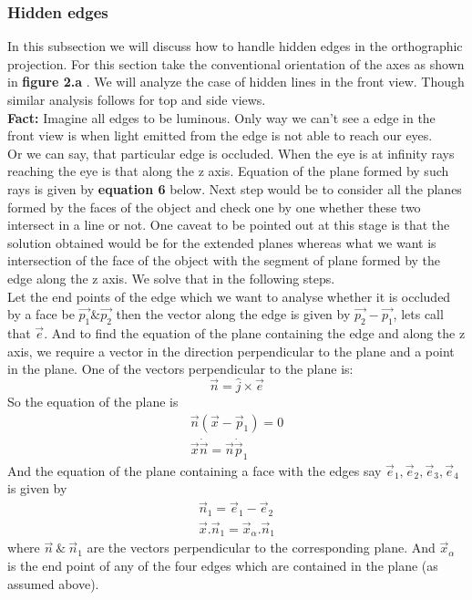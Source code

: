 \subsubsection{Hidden edges}
In this subsection we will discuss how to handle hidden edges in the orthographic projection. For this section take the conventional orientation of the axes as shown in \textbf{figure 2.a }. We will analyze the case of hidden lines in the front view.  Though similar analysis follows for top and side views.\\
\textbf{Fact:} Imagine all edges to be luminous. Only way we can't see a edge in the front view is when light emitted from the edge is not able to reach our eyes.\\
\indent Or we can say, that particular edge is occluded. When the eye is at infinity rays reaching the eye is that along the z axis. Equation of the plane formed by such rays is given by \textbf{equation 6 } below. Next step would be to consider all the planes formed by the faces of the object and check one by one whether these two intersect in a line or not. One caveat to be pointed out at this stage is that the solution obtained would be for the extended planes whereas what we want is intersection of the face of the object with the segment of plane formed by the edge along the z axis. We solve that in the following steps.\\
Let the end points of the edge which we want to analyse whether it is occluded by a face  be $\vec{p_1} \& \vec{p_2}$ then the vector along the edge is given by $\vec{p_2} - \vec{p_1}$, lets call that $\vec{e}$. And to find the equation of the plane containing the edge and along the z axis, we require a vector in the direction perpendicular to the plane and a point in the plane. One of the vectors perpendicular to the plane is:
$$ \vec{n} = \hat{j} \times \vec{e} $$ 
So the equation of the plane is
\begin {align} \vec{n} (\vec{x} - \vec{p}_1) = 0 \\
\vec{x}\dot\vec{n} = \vec{n}\dot\vec{p}_1
\end{align}
And the equation of the plane containing a face with the edges say $\vec{e}_1 , \vec{e}_2, \vec{e}_3, \vec{e}_4$ is given by
\begin{align}
	\vec{n}_1 = \vec{e}_1 - \vec{e}_2 \\
    \vec{x} . \vec{n}_1 = \vec{x}_\alpha . \vec{n}_1   
 \end{align}
 where $\vec{n} \ \& \  \vec{n}_1$ are the vectors perpendicular to the corresponding plane. And $\vec{x}_\alpha$ is the end point of any of the four edges which are contained in the plane (as assumed above).\\

